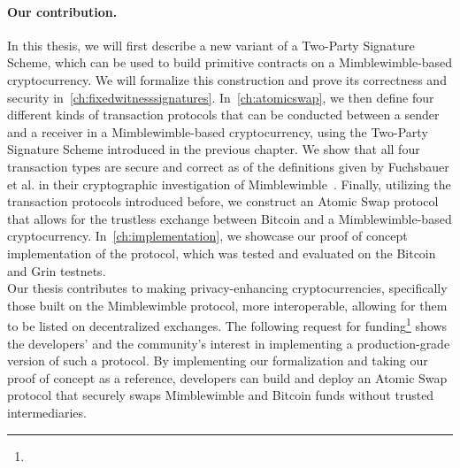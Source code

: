 \paragraph{Our contribution.} In this thesis, we will first describe a new variant of a Two-Party Signature Scheme, which can be used to build primitive contracts on a Mimblewimble-based cryptocurrency.
We will formalize this construction and prove its correctness and security in~\cref{ch:fixedwitnesssignatures}.
In~\cref{ch:atomicswap}, we then define four different kinds of transaction protocols that can be conducted between a sender and a receiver in a Mimblewimble-based cryptocurrency, using the Two-Party Signature Scheme introduced in the previous chapter.
We show that all four transaction types are secure and correct as of the definitions given by Fuchsbauer et al. in their cryptographic investigation of Mimblewimble~\cite{fuchsbauer2019aggregate}.
Finally, utilizing the transaction protocols introduced before, we construct an Atomic Swap protocol that allows for the trustless exchange between Bitcoin and a Mimblewimble-based cryptocurrency.
In~\cref{ch:implementation}, we showcase our proof of concept implementation of the protocol, which was tested and evaluated on the Bitcoin and Grin testnets.\\
Our thesis contributes to making privacy-enhancing cryptocurrencies, specifically those built on the Mimblewimble protocol, more interoperable, allowing for them to be listed on decentralized exchanges.
The following request for funding\footnote{\urlgrinfund} shows the developers' and the community's interest in implementing a production-grade version of such a protocol.
By implementing our formalization and taking our proof of concept as a reference, developers can build and deploy an Atomic Swap protocol that securely swaps Mimblewimble and Bitcoin funds without trusted intermediaries.